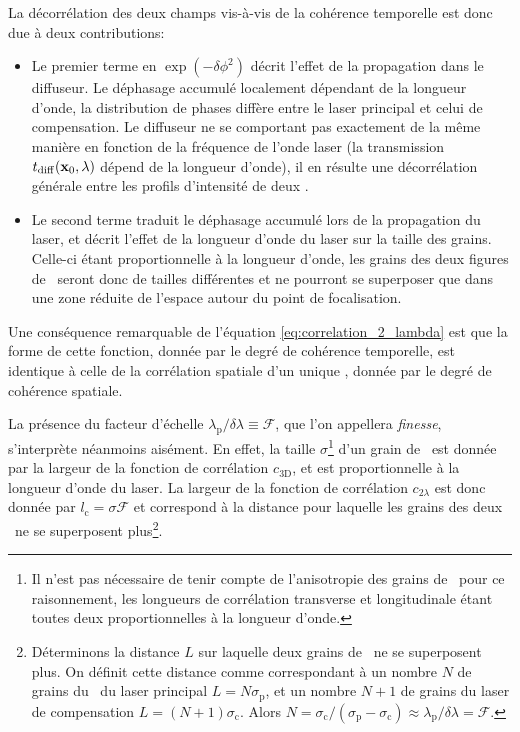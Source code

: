 La décorrélation des deux champs vis-à-vis de la cohérence temporelle est donc due à deux contributions:
\begin{itemize}
\item[\textendash] Le premier terme en $\exp{(-\delta\phi^2)}$ décrit l'effet de la propagation dans le diffuseur. Le déphasage accumulé localement dépendant de la longueur d'onde, la distribution de phases diffère entre le laser principal et celui de compensation. Le diffuseur ne se comportant pas exactement de la même manière en fonction de la fréquence de l'onde laser (la transmission $t_{\mathrm{diff}}(\mathbf{x}_0,\lambda)$ dépend de la longueur d'onde), il en résulte une décorrélation générale entre les profils d'intensité de deux \speckles .
\item[\textendash] Le second terme traduit le déphasage accumulé lors de la propagation du laser, et décrit l'effet de la longueur d'onde du laser sur la taille des grains. Celle-ci étant proportionnelle à la longueur d'onde, les grains des deux figures de \speckle\ seront donc de tailles différentes et ne pourront se superposer que dans une zone réduite de l'espace autour du point de focalisation.
\end{itemize}
Une conséquence remarquable de l'équation \ref{eq:correlation_2_lambda} est que la forme de cette fonction, donnée par le degré de cohérence temporelle, est identique à celle de la corrélation spatiale d'un unique \speckle , donnée par le degré de cohérence spatiale. 


La présence du facteur d'échelle $\lambda_{\mathrm{p}}/\delta \lambda\equiv \mathcal{F}$, que l'on appellera \emph{finesse}, s'interprète néanmoins aisément. En effet, la taille $\sigma$\footnote{Il n'est pas nécessaire de tenir compte de l'anisotropie des grains de \speckle\ pour ce raisonnement, les longueurs de corrélation transverse et longitudinale étant toutes deux proportionnelles à la longueur d'onde.} d'un grain de \speckle\ est donnée par la largeur de la fonction de corrélation $c_{\mathrm{3D}}$, et est proportionnelle à la longueur d'onde du laser. La largeur de la fonction de corrélation $c_{\mathrm{2}\lambda}$ est donc donnée par $l_{\mathrm{c}}=\sigma \mathcal{F}$ et correspond à la distance pour laquelle les grains des deux \speckles\ ne se superposent plus\footnote{Déterminons la distance $L$ sur laquelle deux grains de \speckle\ ne se superposent plus. On définit cette distance comme correspondant à un nombre $N$ de grains du \speckle\ du laser principal $L=N\sigma_{\mathrm{p}}$, et un nombre $N+1$ de grains du laser de compensation $L=(N+1)\sigma_{\mathrm{c}}$. Alors $N=\sigma_{\mathrm{c}}/(\sigma_{\mathrm{p}}-\sigma_{\mathrm{c}})\approx \lambda_{\mathrm{p}}/\delta\lambda=\mathcal{F}$.}.


